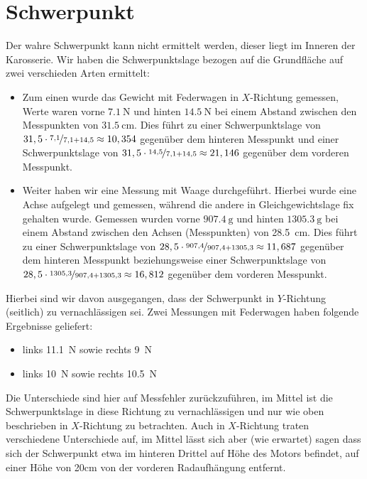\documentclass[10pt]{article}
\begin{document}
\section{Schwerpunkt}
    Der wahre Schwerpunkt kann nicht ermittelt werden, dieser liegt im Inneren der Karosserie.
    Wir haben die Schwerpunktslage bezogen auf die Grundfläche auf zwei verschieden Arten ermittelt:
    \begin{itemize}
    \item Zum einen wurde das Gewicht mit Federwagen in $X$-Richtung gemessen, Werte waren vorne $\SI{7,1}{\newton}$ und hinten $\SI{14,5}{\newton}$ bei einem Abstand zwischen den Messpunkten von $\SI{31,5}{\cm}$. Dies führt zu einer Schwerpunktslage von $31,5 \cdot \nicefrac{7,1}{7,1+14,5} \approx 10,354$ gegenüber dem hinteren Messpunkt und einer Schwerpunktslage von $31,5 \cdot \nicefrac{14,5}{7,1+14,5} \approx 21,146$ gegenüber dem vorderen Messpunkt.
    \item Weiter haben wir eine Messung mit Waage durchgeführt. Hierbei wurde eine Achse aufgelegt und gemessen, während die andere in Gleichgewichtslage fix gehalten wurde. Gemessen wurden vorne $\SI{907,4}{\gram}$ und hinten $\SI{1305,3}{\gram}$ bei einem Abstand zwischen den Achsen (Messpunkten) von \SI{28,5}{\cm}. Dies führt zu einer Schwerpunktslage von $28,5\cdot\nicefrac{907,4}{907,4+1305,3} \approx 11,687$ gegenüber dem hinteren Messpunkt beziehungsweise einer Schwerpunktslage von $28,5\cdot\nicefrac{1305,3}{907,4+1305,3} \approx 16,812$ gegenüber dem vorderen Messpunkt.
    \end{itemize}

    Hierbei sind wir davon ausgegangen, dass der Schwerpunkt in $Y$-Richtung (seitlich) zu vernachlässigen sei. Zwei Messungen mit Federwagen haben folgende Ergebnisse geliefert:
    \begin{itemize}
        \item links \SI{11,1}{\newton} sowie rechts \SI{9}{\newton}
        \item links \SI{10}{\newton} sowie rechts \SI{10,5}{\newton}
    \end{itemize}

    Die Unterschiede sind hier auf Messfehler zurückzuführen, im Mittel ist die Schwerpunktslage in diese Richtung zu vernachlässigen und nur wie oben beschrieben in $X$-Richtung zu betrachten.
    Auch in $X$-Richtung traten verschiedene Unterschiede auf, im Mittel lässt sich aber (wie erwartet) sagen dass sich der Schwerpunkt etwa im hinteren Drittel auf Höhe des Motors befindet, auf einer Höhe von 20cm von der vorderen Radaufhängung entfernt.
\end{document}
